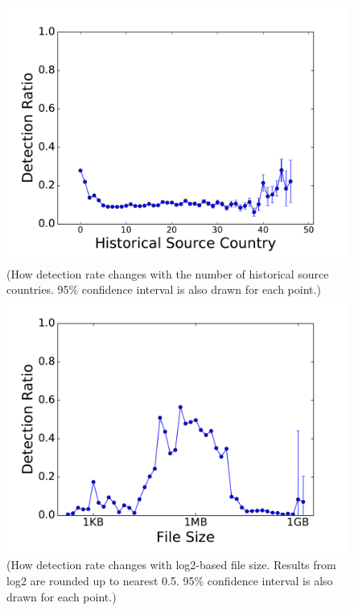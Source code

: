 \begin{figure}[!htb]
  \includegraphics[width=\linewidth]{figure/SubCountry}
{\footnotesize{(How detection rate changes with the number of historical source countries.
95\% confidence interval is also drawn for each point.)}}
\endminipage\hfill
{}
  \includegraphics[width=\linewidth]{figure/size}
  {\footnotesize{(How detection rate changes with log2-based file size.
Results from log2 are rounded up to nearest 0.5.
95\% confidence interval is also drawn for each point.)}}

\end{figure}
